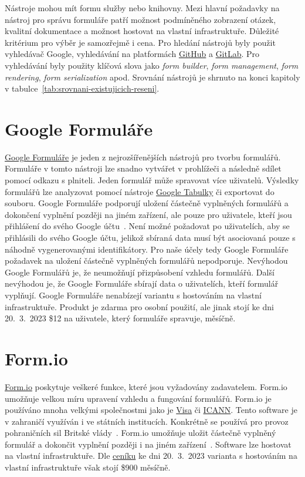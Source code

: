 Nástroje mohou mít formu služby nebo knihovny.
Mezi hlavní požadavky na nástroj pro správu formuláře patří možnost podmíněného zobrazení otázek, kvalitní dokumentace a možnost hostovat na vlastní infrastruktuře.
Důležité kritérium pro výběr je samozřejmě i cena.
Pro hledání nástrojů byly použit vyhledávač Google, vyhledávání na platformách \href{https://github.com/}{GitHub} a \href{https://about.gitlab.com/}{GitLab}.
Pro vyhledávání byly použity klíčová slova jako \textit{form builder}, \textit{form management}, \textit{form rendering}, \textit{form serialization} apod.
Srovnání nástrojů je shrnuto na konci kapitoly v tabulce~\ref{tab:srovnani-existujicich-reseni}.

\section*{Google Formuláře}\label{sec:google-formulare}

\href{https://www.google.com/forms/about/}{Google Formuláře} je jeden z nejrozšířenějších nástrojů pro tvorbu formulářů.
Formuláře v tomto nástroji lze snadno vytvářet v prohlížeči a následně sdílet pomocí odkazu s plniteli.
Jeden formulář může spravovat více uživatelů.
Výsledky formulářů lze analyzovat pomocí nástroje \href{https://www.google.com/intl/cs/sheets/about/}{Google Tabulky} či exportovat do souboru.
Google Formuláře podporují uložení částečně vyplněných formulářů a dokončení vyplnění později na jiném zařízení, ale pouze pro uživatele, kteří jsou přihlášení do svého Google účtu~\cite{save-and-return-google-forms}.
Není možné požadovat po uživatelích, aby se přihlásili do svého Google účtu, jelikož sbíraná data musí být asociovaná pouze s náhodně vygenerovanými identifikátory.
Pro naše účely tedy Google Formuláře požadavek na uložení částečně vyplněných formulářů nepodporuje.
Nevýhodou Google Formulářů je, že neumožňují přizpůsobení vzhledu formulářů.
Další nevýhodou je, že Google Formuláře sbírají data o uživatelích, kteří formulář vyplňují.
Google Formuláře nenabízejí variantu s hostováním na vlastní infrastruktuře.
Produkt je zdarma pro osobní použití, ale jinak stojí ke dni 20.~3.~2023 \$12 na uživatele, který formuláře spravuje, měsíčně.

\section*{Form.io}\label{sec:formio}

\href{https://form.io/}{Form.io} poskytuje veškeré funkce, které jsou vyžadovány zadavatelem.
Form.io umožňuje velkou míru upravení vzhledu a fungování formulářů.
Form.io je používáno mnoha velkými společnostmi jako je \href{https://www.visa.cz/}{Visa} či \href{https://www.icann.org/}{ICANN}\@.
Tento software je v zahraničí využíván i ve státních institucích.
Konkrétně se používá pro provoz pohraničních sil Britské vlády~\cite{formio-use-camundacon}.
Form.io umožňuje uložit částečně vyplněný formulář a dokončit vyplnění později i na jiném zařízení~\cite{save-and-return-formio}.
Software lze hostovat na vlastní infrastruktuře.
Dle \href{https://form.io/pricing}{ceníku} ke dni 20.~3.~2023 varianta s hostováním na vlastní infrastruktuře však stojí \$900 měsíčně.


